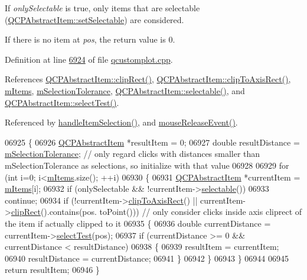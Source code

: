 If {\itshape only\+Selectable} is true, only items that are selectable (\hyperlink{a00022_a8a8e32a55bc478b849756a78c2d87fd2}{Q\+C\+P\+Abstract\+Item\+::set\+Selectable}) are considered.

If there is no item at {\itshape pos}, the return value is 0. 

Definition at line \hyperlink{a00115_source_l06924}{6924} of file \hyperlink{a00115_source}{qcustomplot.\+cpp}.



References \hyperlink{a00115_source_l11190}{Q\+C\+P\+Abstract\+Item\+::clip\+Rect()}, \hyperlink{a00116_source_l00850}{Q\+C\+P\+Abstract\+Item\+::clip\+To\+Axis\+Rect()}, \hyperlink{a00116_source_l02117}{m\+Items}, \hyperlink{a00116_source_l02128}{m\+Selection\+Tolerance}, \hyperlink{a00116_source_l00853}{Q\+C\+P\+Abstract\+Item\+::selectable()}, and \hyperlink{a00022_a2e19e88f67f4ba9c13b7e33bd447c075}{Q\+C\+P\+Abstract\+Item\+::select\+Test()}.



Referenced by \hyperlink{a00115_source_l07917}{handle\+Item\+Selection()}, and \hyperlink{a00115_source_l07691}{mouse\+Release\+Event()}.


\begin{DoxyCode}
06925 \{
06926   \hyperlink{a00022}{QCPAbstractItem} *resultItem = 0;
06927   \textcolor{keywordtype}{double} resultDistance = \hyperlink{a00116_a6694031fcdb13682d098f5d21da86f97}{mSelectionTolerance}; \textcolor{comment}{// only regard clicks with distances
       smaller than mSelectionTolerance as selections, so initialize with that value}
06928   
06929   \textcolor{keywordflow}{for} (\textcolor{keywordtype}{int} i=0; i<\hyperlink{a00116_a6fcfff6ea3ccabcac8818943adb79a72}{mItems}.size(); ++i)
06930   \{
06931     \hyperlink{a00022}{QCPAbstractItem} *currentItem = \hyperlink{a00116_a6fcfff6ea3ccabcac8818943adb79a72}{mItems}[i];
06932     \textcolor{keywordflow}{if} (onlySelectable && !currentItem->\hyperlink{a00022_a9189e752025533e1595eaade0009a3bc}{selectable}())
06933       \textcolor{keywordflow}{continue};
06934     \textcolor{keywordflow}{if} (!currentItem->\hyperlink{a00022_a5b0ea171823033bcb8aee81f4a034871}{clipToAxisRect}() || currentItem->\hyperlink{a00022_a538e25ff8856534582f5b2b400a46405}{clipRect}().contains(pos.
      toPoint())) \textcolor{comment}{// only consider clicks inside axis cliprect of the item if actually clipped to it}
06935     \{
06936       \textcolor{keywordtype}{double} currentDistance = currentItem->\hyperlink{a00022_a2e19e88f67f4ba9c13b7e33bd447c075}{selectTest}(pos);
06937       \textcolor{keywordflow}{if} (currentDistance >= 0 && currentDistance < resultDistance)
06938       \{
06939         resultItem = currentItem;
06940         resultDistance = currentDistance;
06941       \}
06942     \}
06943   \}
06944   
06945   \textcolor{keywordflow}{return} resultItem;
06946 \}
\end{DoxyCode}


